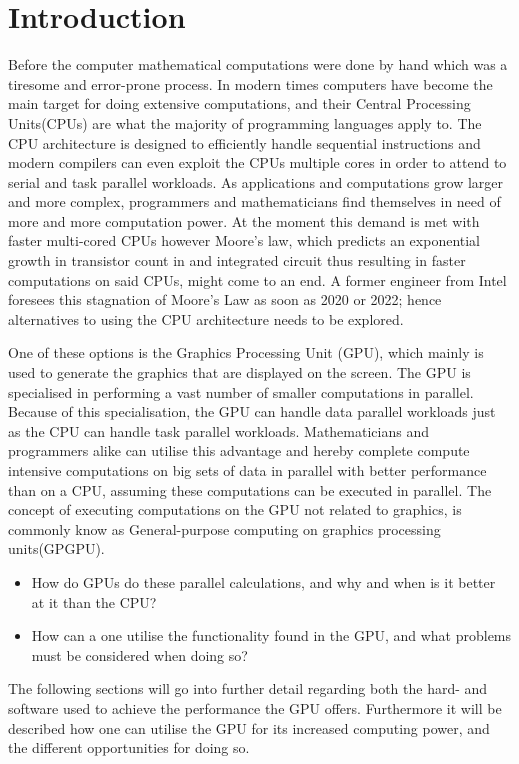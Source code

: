 \chapter{Introduction} %
\label{cha:introduction}
Before the computer mathematical computations were done by hand which was a tiresome and error-prone process.
In modern times computers have become the main target for doing extensive computations, and their Central Processing Units(CPUs) are what the majority of programming languages apply to.
The CPU architecture is designed to efficiently handle sequential instructions and modern compilers can even exploit the CPUs multiple cores in order to attend to serial and task parallel workloads.
As applications and computations grow larger and more complex, programmers and mathematicians find themselves in need of more and more computation power.\citep[pp. 4]{OpenCL_AMD}
At the moment this demand is met with faster multi-cored CPUs however Moore's law, which predicts an exponential growth in transistor count in and integrated circuit thus resulting in faster computations on said CPUs, might come to an end.
A former engineer from Intel foresees this stagnation of Moore's Law as soon as 2020 or 2022; hence alternatives to using the CPU architecture needs to be explored. \citep{Moore2013}

One of these options is the Graphics Processing Unit (GPU), which mainly is used to generate the graphics that are displayed on the screen.
The GPU is specialised in performing a vast number of smaller computations in parallel.
Because of this specialisation, the GPU can handle data parallel workloads just as the CPU can handle task parallel workloads.
Mathematicians and programmers alike can utilise this advantage and hereby complete compute intensive computations on big sets of data in parallel with better performance than on a CPU, assuming these computations can be executed in parallel.
The concept of executing computations on the GPU not related to graphics, is commonly know as General-purpose computing on graphics processing units(GPGPU).

\begin{itemize}
	\item How do GPUs do these parallel calculations, and why and when is it better at it than the CPU?
	\item How can a one utilise the functionality found in the GPU, and what problems must be considered when doing so? 
\end{itemize}

The following sections will go into further detail regarding both the hard- and software used to achieve the performance the GPU offers.
Furthermore it will be described how one can utilise the GPU for its increased computing power, and the different opportunities for doing so. 

\newpage
